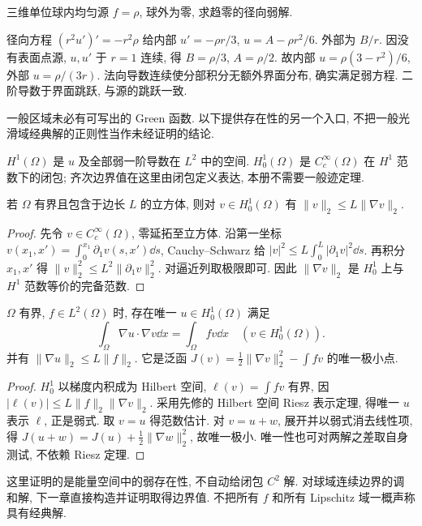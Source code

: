 \begin{example}
三维单位球内均匀源 $f=\rho$, 球外为零, 求趋零的径向弱解.
\end{example}
\begin{solution}
径向方程 $(r^2u')'=-r^2\rho$ 给内部 $u'= -\rho r/3$, $u=A-\rho r^2/6$. 外部为 $B/r$. 因没有表面点源, $u,u'$ 于 $r=1$ 连续, 得 $B=\rho/3$, $A=\rho/2$. 故内部 $u=\rho(3-r^2)/6$, 外部 $u=\rho/(3r)$. 法向导数连续使分部积分无额外界面分布, 确实满足弱方程. 二阶导数于界面跳跃, 与源的跳跃一致.
\end{solution}
一般区域未必有可写出的 Green 函数. 以下提供存在性的另一个入口, 不把一般光滑域经典解的正则性当作未经证明的结论.
\begin{definition}
$H^1(\Omega)$ 是 $u$ 及全部弱一阶导数在 $L^2$ 中的空间. $H_0^1(\Omega)$ 是 $C_c^\infty(\Omega)$ 在 $H^1$ 范数下的闭包; 齐次边界值在这里由闭包定义表达, 本册不需要一般迹定理.
\end{definition}
\begin{lemma}\label{lem:poincare}
若 $\Omega$ 有界且包含于边长 $L$ 的立方体, 则对 $v\in H_0^1(\Omega)$ 有 $\|v\|_2\le L\|\nabla v\|_2$.
\end{lemma}
\begin{proof}
先令 $v\in C_c^\infty(\Omega)$, 零延拓至立方体. 沿第一坐标 $v(x_1,x')=\int_0^{x_1}\partial_1v(s,x')\dd s$, Cauchy--Schwarz 给 $|v|^2\le L\int_0^L|\partial_1v|^2\dd s$. 再积分 $x_1,x'$ 得 $\|v\|_2^2\le L^2\|\partial_1v\|_2^2$. 对逼近列取极限即可. 因此 $\|\nabla v\|_2$ 是 $H_0^1$ 上与 $H^1$ 范数等价的完备范数.
\end{proof}
\begin{theorem}\label{thm:weakpoisson}
$\Omega$ 有界, $f\in L^2(\Omega)$ 时, 存在唯一 $u\in H_0^1(\Omega)$ 满足
\[
\int_\Omega\nabla u\cdot\nabla v\dd x=\int_\Omega f v\dd x\quad(v\in H_0^1(\Omega)).
\]
并有 $\|\nabla u\|_2\le L\|f\|_2$. 它是泛函 $J(v)=\tfrac12\|\nabla v\|_2^2-\int fv$ 的唯一极小点.
\end{theorem}
\begin{proof}
$H_0^1$ 以梯度内积成为 Hilbert 空间, $\ell(v)=\int fv$ 有界, 因 $|\ell(v)|\le L\|f\|_2\|\nabla v\|_2$. 采用先修的 Hilbert 空间 Riesz 表示定理, 得唯一 $u$ 表示 $\ell$, 正是弱式. 取 $v=u$ 得范数估计. 对 $v=u+w$, 展开并以弱式消去线性项, 得 $J(u+w)=J(u)+\tfrac12\|\nabla w\|_2^2$, 故唯一极小. 唯一性也可对两解之差取自身测试, 不依赖 Riesz 定理.
\end{proof}
这里证明的是能量空间中的弱存在性, 不自动给闭包 $C^2$ 解. 对球域连续边界的调和解, 下一章直接构造并证明取得边界值. 不把所有 $f$ 和所有 Lipschitz 域一概声称具有经典解.
